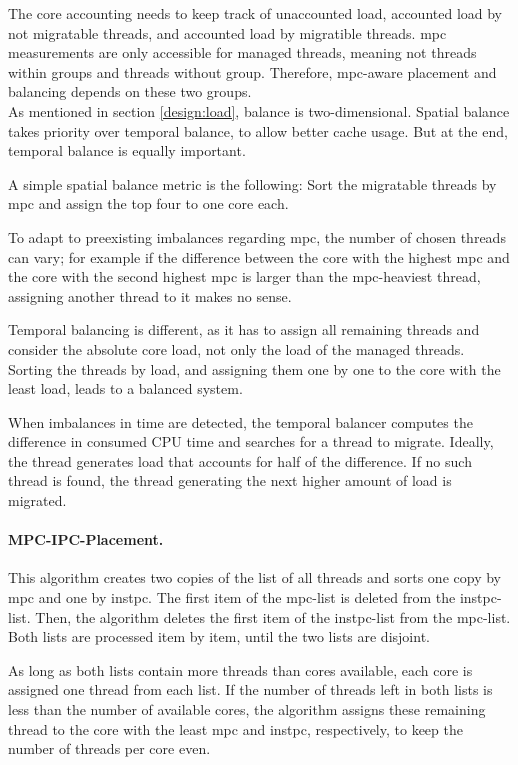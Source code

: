 The core accounting needs to keep track of unaccounted load, accounted load by
not migratable threads, and accounted load by migratible threads.
\Gls{mpc} measurements are only accessible for managed threads, meaning not
threads within groups and threads without group.
Therefore, \gls{mpc}-aware placement and balancing depends on these two
groups.
\\

As mentioned in section \ref{design:load}, balance is two-dimensional.
Spatial balance takes priority over temporal balance, to allow better cache usage.
But at the end, temporal balance is equally important.

A simple spatial balance metric is the following: Sort the migratable threads by
\gls{mpc} and assign the top four to one core each.

To adapt to preexisting imbalances regarding \gls{mpc},  the number of chosen
threads can vary; for example if the difference between the core with the
highest \gls{mpc} and the core with the second highest \gls{mpc} is larger than
the \gls{mpc}-heaviest thread, assigning another thread to it makes no sense.

Temporal balancing is different, as it has to assign all remaining threads and
consider the absolute core load, not only the load of the managed threads.
Sorting the threads by load, and assigning them one by one to the
core with the least load, leads to a balanced system.

When imbalances in time are detected, the temporal balancer computes the
difference in consumed CPU time and searches for a thread to migrate.
Ideally, the thread generates load that accounts for half of the difference.
If no such thread is found, the thread generating the next higher amount of
load is migrated.


\paragraph{MPC-IPC-Placement.}
This algorithm creates two copies of the list of all threads and sorts one copy
by \gls{mpc} and one by \gls{instpc}.
The first item of the \gls{mpc}-list is deleted from the
\gls{instpc}-list.
Then, the algorithm deletes the first item of the  \gls{instpc}-list from the
\gls{mpc}-list.
Both lists are processed item by item, until the two lists are disjoint.

As long as both lists contain more threads than cores available, each core
is assigned one thread from each list.
If the number of threads left in both lists is less than the number of
available cores,
the algorithm assigns these remaining thread to the core with the least
\gls{mpc} and \gls{instpc}, respectively, to keep the number of threads per
core even.

